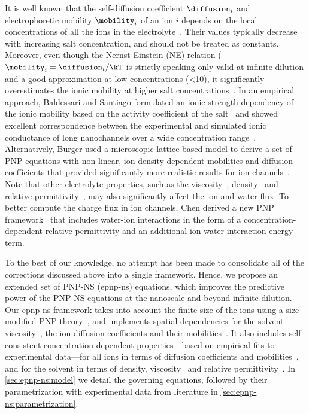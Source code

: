 It is well known that the self-diffusion coefficient $\diffusion_{i}$ and electrophoretic mobility
$\mobility_{i}$ of an ion $i$ depends on the local concentrations of all the ions in the
electrolyte~\cite{ContrerasAburto-2013-1}. Their values typically decrease with increasing salt concentration,
and should not be treated as constants. Moreover, even though the Nernst-Einstein (NE) relation
($\mobility_{i}=\diffusion_{i}/\kT$ is strictly speaking only valid at infinite dilution and a good
approximation at low concentrations (\SI{<10}{\mM}), it significantly overestimates the ionic mobility at
higher salt concentrations~\cite{Mills-1989,Panopoulos-1986,ContrerasAburto-2013-1,ContrerasAburto-2013-2}. In
an empirical approach, Baldessari and Santiago formulated an ionic-strength dependency of the ionic mobility
based on the activity coefficient of the salt~\cite{Baldessari-2008-1} and showed excellent correspondence
between the experimental and simulated ionic conductance of long nanochannels over a wide concentration
range~\cite{Baldessari-2008-2}. Alternatively, Burger \etal{} used a microscopic lattice-based model to derive
a set of PNP equations with non-linear, ion density-dependent mobilities and diffusion coefficients that
provided significantly more realistic results for ion channels~\cite{Burger-2012}. Note that other electrolyte
properties, such as the viscosity~\cite{Hai-Lang-1996}, density~\cite{Hai-Lang-1996} and relative
permittivity~\cite{Gavish-2016}, may also significantly affect the ion and water flux. To better compute the
charge flux in ion channels, Chen derived a new PNP framework~\cite{Chen-2016} that includes water-ion
interactions in the form of a concentration-dependent relative permittivity and an additional ion-water
interaction energy term.

To the best of our knowledge, no attempt has been made to consolidate all of the corrections discussed above
into a single framework. Hence, we propose an extended set of PNP-NS ({\gls{epnp-ns}}) equations, which
improves the predictive power of the {PNP-NS} equations at the nanoscale and beyond infinite dilution. Our
{\gls{epnp-ns}} framework takes into account the finite size of the ions using a size-modified PNP
theory~\cite{Borukhov-1997,Lu-2011}, and implements spatial-dependencies for the solvent
viscosity~\cite{Pronk-2014,Vo-2016,Hsu-2017}, the ion diffusion coefficients and their
mobilities~\cite{Makarov-1998,Noskov-2004,Pederson-2015}. It also includes self-consistent
concentration-dependent properties---based on empirical fits to experimental data---for all ions in terms of
diffusion coefficients and mobilities~\cite{Baldessari-2008-1,Mills-1989}, and for the solvent in terms of
density, viscosity~\cite{Hai-Lang-1996} and relative permittivity~\cite{Gavish-2016}. In
\cref{sec:epnp-ns:model} we detail the governing equations, followed by their parametrization with
experimental data from literature in \cref{sec:epnp-ns:parametrization}.


